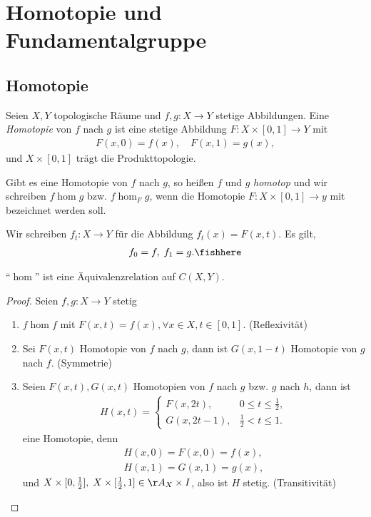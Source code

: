 \section{Homotopie und Fundamentalgruppe}
\subsection{Homotopie}
\begin{defn}
\label{defn:3.1.1}
Seien $X,Y$ topologische Räume und $f,g: X\to Y$ stetige Abbildungen. Eine
\emph{Homotopie} von $f$ nach $g$ ist eine stetige Abbildung $F: X\times [0,1]
\to Y$ mit
\begin{align*}
F(x,0) = f(x),\quad F(x,1) = g(x),
\end{align*}
und $X\times[0,1]$ trägt die Produkttopologie.

Gibt es eine Homotopie von $f$ nach $g$, so heißen $f$ und $g$ \emph{homotop}
und wir schreiben $f\hom g$ bzw. $f\hom_F g$, wenn die Homotopie $F: X\times[0,1]\to y$
mit bezeichnet werden soll.

Wir schreiben $f_t: X\to Y$ für die Abbildung $f_t(x) = F(x,t)$. Es gilt,
\begin{align*}
f_0 = f,\;f_1 = g.\fishhere
\end{align*}
\end{defn}

\begin{lem}
\label{prop:3.1.2}
``$\hom$'' ist eine Äquivalenzrelation auf $C(X,Y)$.\fishhere
\end{lem}
\begin{proof}
Seien $f,g: X\to Y$ stetig
\begin{enumerate}
  \item $f\hom f$ mit $F(x,t) = f(x), \forall x\in X, t\in[0,1]$. (Reflexivität)
  \item Sei $F(x,t)$ Homotopie von $f$ nach $g$, dann ist $G(x,1-t)$ Homotopie
  von $g$ nach $f$. (Symmetrie)
  \item Seien $F(x,t), G(x,t)$ Homotopien von $f$ nach $g$ bzw. $g$ nach $h$,
  dann ist
  \begin{align*}
  H(x,t) = \begin{cases}
           F(x,2t), & 0\le t\le \frac{1}{2},\\
           G(x,2t-1), & \frac{1}{2}< t\le 1.
           \end{cases}
  \end{align*}
eine Homotopie, denn
\begin{align*}
H(x,0) = F(x,0) = f(x),\\
H(x,1) = G(x,1) = g(x),
\end{align*}
und $X\times[0,\frac{1}{2}],\; X\times [\frac{1}{2},1]\in \AA_X\times I$, also
ist $H$ stetig. (Transitivität)\qedhere
\end{enumerate}
\end{proof}

